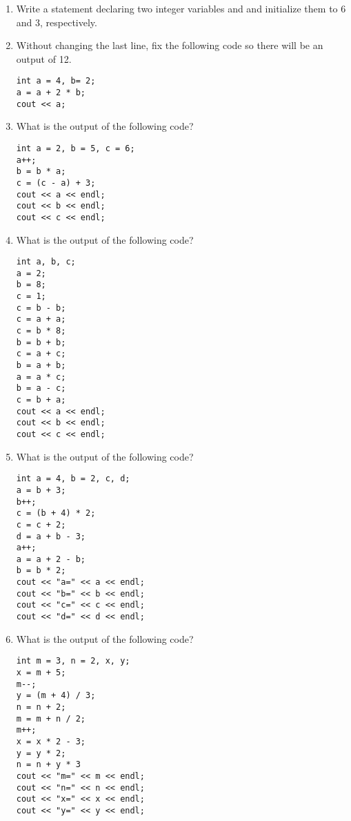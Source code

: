 \begin{enumerate}
\item Write a statement declaring two integer variables  and  and initialize them to 6 and 3, respectively. 
\item Without changing the last line, fix the following code so there will be an output of 12. \nopagebreak[4]

\noindent\begin{minipage}{\linewidth}\begin{lstlisting}
int a = 4, b= 2;
a = a + 2 * b;
cout << a;
\end{lstlisting}\end{minipage}

\item What is the output of the following code? \nopagebreak[4]

\noindent\begin{minipage}{\linewidth}\begin{lstlisting}
int a = 2, b = 5, c = 6;
a++;
b = b * a;
c = (c - a) + 3;
cout << a << endl;
cout << b << endl;
cout << c << endl;
\end{lstlisting}\end{minipage}	
	
\item What is the output of the following code? \nopagebreak[4]

\noindent\begin{minipage}{\linewidth}\begin{lstlisting}
int a, b, c;
a = 2;
b = 8;
c = 1;
c = b - b;
c = a + a;
c = b * 8;
b = b + b;
c = a + c;
b = a + b;
a = a * c;
b = a - c;
c = b + a;
cout << a << endl;
cout << b << endl;
cout << c << endl;
\end{lstlisting}\end{minipage}

\item What is the output of the following code? \nopagebreak[4]

\noindent\begin{minipage}{\linewidth}\begin{lstlisting}
int a = 4, b = 2, c, d;
a = b + 3;
b++;
c = (b + 4) * 2;
c = c + 2;
d = a + b - 3;
a++;
a = a + 2 - b;
b = b * 2;
cout << "a=" << a << endl;  
cout << "b=" << b << endl;  
cout << "c=" << c << endl;  
cout << "d=" << d << endl; 
\end{lstlisting}\end{minipage}

\item What is the output of the following code? \nopagebreak[4]

\noindent\begin{minipage}{\linewidth}\begin{lstlisting}
int m = 3, n = 2, x, y;
x = m + 5;
m--;
y = (m + 4) / 3;
n = n + 2;
m = m + n / 2;
m++;
x = x * 2 - 3;
y = y * 2;
n = n + y * 3
cout << "m=" << m << endl; 
cout << "n=" << n << endl;  
cout << "x=" << x << endl;   
cout << "y=" << y << endl; 
\end{lstlisting}\end{minipage}
\end{enumerate}

